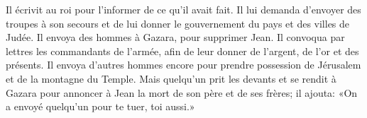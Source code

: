 Il écrivit au roi pour l’informer de ce qu’il avait fait.
	Il lui demanda d’envoyer des troupes à son secours
	et de lui donner le gouvernement du pays et des villes de Judée.
Il envoya des hommes à Gazara, pour supprimer Jean.
Il convoqua par lettres les commandants de l’armée,
	afin de leur donner de l’argent, de l’or et des présents.
Il envoya d’autres hommes encore
	pour prendre possession de Jérusalem et de la montagne du Temple.
Mais quelqu’un prit les devants et se rendit à Gazara
	pour annoncer à Jean la mort de son père et de ses frères;
	il ajouta: «On a envoyé quelqu’un pour te tuer, toi aussi.»
